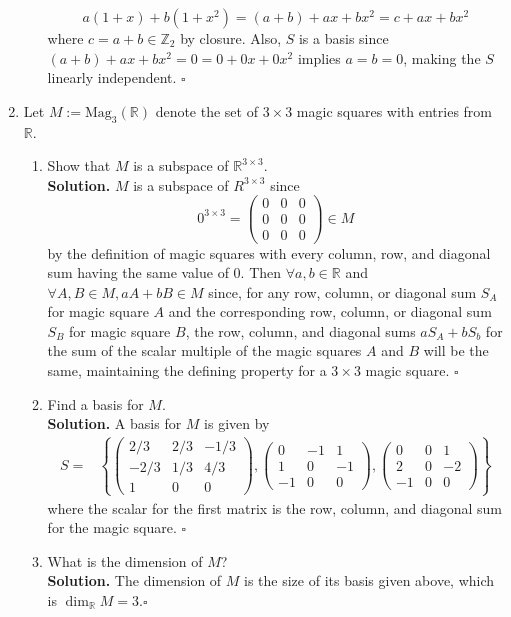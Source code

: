 \documentclass[11pt,twoside]{article}
\newcommand{\R}{\mathbb{R}}
\newcommand{\Z}{\mathbb{Z}}
\newcommand{\m}[1]{\begin{pmatrix}#1\end{pmatrix}}
\begin{document}
\begin{enumerate}
\begin{enumerate}
                    \[a(1+x)+b(1+x^2)=(a+b)+ax+bx^2=c+ax+bx^2\]
                    where $c=a+b\in \Z_2$ by closure. Also, $S$ is a basis since $(a+b)+ax+bx^2=0=0+0x+0x^2$ implies $a=b=0$, making the $S$ linearly independent. $\square$
          \end{enumerate}
    \item Let $M:=\text{Mag}_3(\R)$ denote the set of $3\times 3$ magic squares with entries from $\R$.
          \begin{enumerate}
              \item Show that $M$ is a subspace of $\R^{3\times 3}$. \\
                    \textbf{Solution.} $M$ is a subspace of $R^{3\times 3}$ since
                    \[0^{3\times 3}=\m{0&0&0\\0&0&0\\0&0&0}\in M\]
                    by the definition of magic squares with every column, row, and diagonal sum having the same value of 0. Then $\forall a,b\in\R$ and $\forall A,B\in M, aA+bB\in M$ since, for any row, column, or diagonal sum $S_A$ for magic square $A$ and the corresponding row, column, or diagonal sum $S_B$ for magic square $B$, the row, column, and diagonal sums $aS_A + bS_b$ for the sum of the scalar multiple of the magic squares $A$ and $B$ will be the same, maintaining the defining property for a $3\times 3$ magic square. $\square$
              \item Find a basis for $M$. \\
                    \textbf{Solution.} A basis for $M$ is given by
                    \begin{align*}
                        S= & \left\{\m{2/3 & 2/3 & -1/3 \\-2/3&1/3&4/3\\1&0&0},\m{0&-1&1\\1&0&-1\\-1&0&0},\m{0&0&1\\2&0&-2\\-1&0&0}\right\}
                    \end{align*}
                    where the scalar for the first matrix is the row, column, and diagonal sum for the magic square. $\square$
              \item What is the dimension of $M$? \\
                    \textbf{Solution.} The dimension of $M$ is the size of its basis given above, which is $\dim_\R{M}=3$.$\square$
          \end{enumerate}

\end{enumerate}
\end{document}

